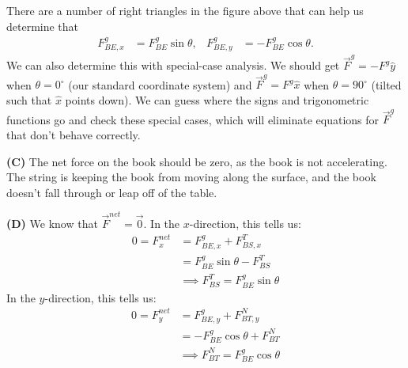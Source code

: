 \documentclass[]{article}
\begin{document}
\begin{TeacherMargin}
\begin{center}
\end{center}
There are a number of right triangles in the figure above that can help us determine that
\begin{align*}
	F^{g}_{BE,x} & = F^{g}_{BE}\sin\theta, & F^{g}_{BE,y} & = -F^{g}_{BE}\cos\theta.
\end{align*}
We can also determine this with special-case analysis. We should get $\vec{F}^{g} = -F^{g}\hat{y}$ when $\theta=0^{\circ}$ (our standard coordinate system) and $\vec{F}^{g} = F^{g}\hat{x}$ when $\theta=90^{\circ}$ (tilted such that $\hat{x}$ points down). We can guess where the signs and trigonometric functions go and check these special cases, which will eliminate equations for $\vec{F}^{g}$ that don't behave correctly.

\noindent\textbf{(C)} 
The net force on the book should be zero, as the book is not accelerating. The string is keeping the book from moving along the surface, and the book doesn't fall through or leap off of the table.

\noindent\textbf{(D)} 
We know that $\vec{F}^{net} = \vec{0}$. In the $x$-direction, this tells us:
\begin{align*}
	0 = F^{net}_{x} & = F^{g}_{BE,x} + F^{T}_{BS,x} \\
	& = F^{g}_{BE}\sin\theta - F^{T}_{BS} \\
	& \implies F^{T}_{BS} = F^{g}_{BE}\sin\theta
\end{align*}
In the $y$-direction, this tells us:
\begin{align*}
	0 = F^{net}_{y} & = F^{g}_{BE,y} + F^{N}_{BT,y} \\
	& = -F^{g}_{BE}\cos\theta + F^{N}_{BT} \\
	& \implies F^{N}_{BT} = F^{g}_{BE}\cos\theta
\end{align*}
\end{TeacherMargin}
\end{document}
